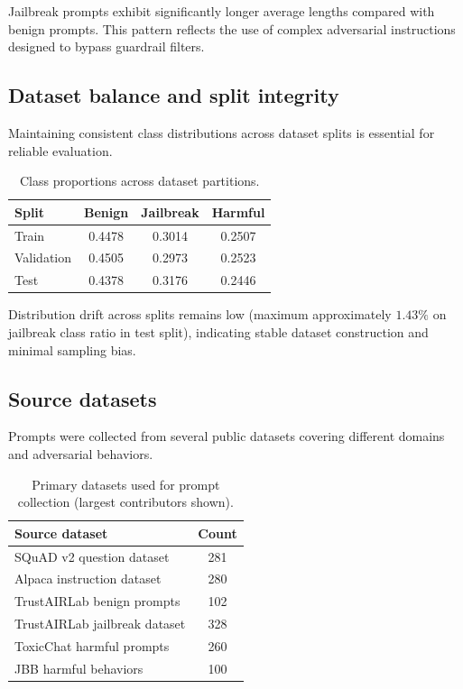 \documentclass[11pt]{article}
\begin{document}
Jailbreak prompts exhibit significantly longer average lengths compared with benign prompts. This pattern reflects the use of complex adversarial instructions designed to bypass guardrail filters.


\subsection{Dataset balance and split integrity}

Maintaining consistent class distributions across dataset splits is essential for reliable evaluation.

\begin{table}[h]
\centering
\begin{tabular}{lccc}
\toprule
Split & Benign & Jailbreak & Harmful \\
\midrule
Train & 0.4478 & 0.3014 & 0.2507 \\
Validation & 0.4505 & 0.2973 & 0.2523 \\
Test & 0.4378 & 0.3176 & 0.2446 \\
\bottomrule
\end{tabular}
\caption{Class proportions across dataset partitions.}
\label{tab:split_ratios}
\end{table}

Distribution drift across splits remains low (maximum approximately $1.43\%$ on jailbreak class ratio in test split), indicating stable dataset construction and minimal sampling bias.


\subsection{Source datasets}

Prompts were collected from several public datasets covering different domains and adversarial behaviors.

\begin{table}[h]
\centering
\begin{tabular}{lc}
\toprule
Source dataset & Count \\
\midrule
SQuAD v2 question dataset & 281 \\
Alpaca instruction dataset & 280 \\
TrustAIRLab benign prompts & 102 \\
TrustAIRLab jailbreak dataset & 328 \\
ToxicChat harmful prompts & 260 \\
JBB harmful behaviors & 100 \\
\bottomrule
\end{tabular}
\caption{Primary datasets used for prompt collection (largest contributors shown).}
\label{tab:source_datasets}
\end{table}
\end{document}
